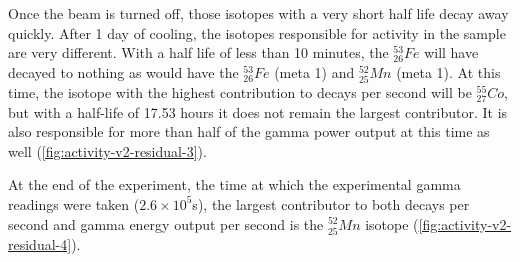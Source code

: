 Once the beam is turned off, those isotopes with a very short half life decay away quickly.  After 1 day of cooling, the isotopes responsible for activity in the sample are very different.  With a half life of less than 10 minutes, the ${}^{53}_{26}Fe$ will have decayed to nothing as would have the ${}^{53}_{26}Fe$ (meta 1) and ${}^{52}_{25}Mn$ (meta 1).  At this time, the isotope with the highest contribution to decays per second will be ${}^{55}_{27}Co$, but with a half-life of 17.53 hours it does not remain the largest contributor.  It is also responsible for more than half of the gamma power output at this time as well (\ref{fig:activity-v2-residual-3}).

At the end of the experiment, the time at which the experimental gamma readings were taken ($2.6 \times 10^5$s), the largest contributor to both decays per second and gamma energy output per second is the ${}^{52}_{25}Mn$ isotope (\ref{fig:activity-v2-residual-4}).


